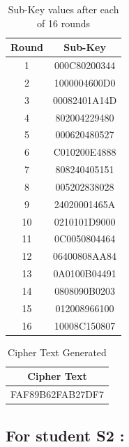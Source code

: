 \documentclass[12pt, letterpaper]{article}
\begin{document}
\begin{table}[h]
    \centering
    \begin{tabular}{|c|c|}
        \hline
        \textbf{Round} & \textbf{Sub-Key} \\
        \hline
        1 & 000C80200344
 \\
        \hline
        2 & 1000004600D0
 \\
        \hline
        3 & 00082401A14D
 \\
        \hline
        4 & 802004229480
 \\
        \hline
        5 & 000620480527
 \\
        \hline 
        6 & C010200E4888
 \\
        \hline
        7 & 808240405151
 \\
        \hline
        8 & 005202838028
 \\
        \hline
        9 & 24020001465A
 \\
        \hline
        10 & 0210101D9000
 \\
        \hline
        11 & 0C0050804464
 \\
        \hline
        12 & 06400808AA84 \\
        \hline
        13 & 0A0100B04491 \\
        \hline
        14 & 0808090B0203
 \\
        \hline
        15 & 012008966100 \\
        \hline
        16 & 10008C150807 \\
        \hline

    \end{tabular}
    \caption{Sub-Key values after each of 16 rounds}
    \label{tab:student-info}
\end{table}



\begin{table}[h]
    \centering
    \begin{tabular}{|c|}
        \hline
          Cipher Text \\
        \hline
           FAF89B62FAB27DF7
  \\
        \hline
    \end{tabular}
    \caption{Cipher Text Generated}
    \label{tab:text-key}
\end{table}

\clearpage

\subsection{{For student S2 :}}
\end{document}
